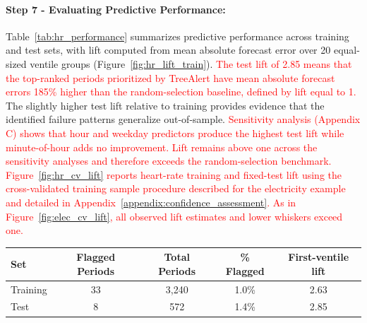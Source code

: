 \documentclass[12pt]{article}
\newcommand{\matt}[1]{\textcolor{red}{#1}}
\let\oldtable\table
\let\endoldtable\endtable
\renewenvironment{table}
  {\oldtable\spacingset{1}}
  {\endoldtable}
\begin{document}
\paragraph{Step 7 - Evaluating Predictive Performance:}
Table~\ref{tab:hr_performance} summarizes predictive performance across training and test sets, with lift computed from mean absolute forecast error over 20 equal-sized ventile groups (Figure~\ref{fig:hr_lift_train}). \matt{The test lift of 2.85 means that the top-ranked periods prioritized by TreeAlert have mean absolute forecast errors 185\% higher than the random-selection baseline, defined by lift equal to 1.} The slightly higher test lift relative to training provides evidence that the identified failure patterns generalize out-of-sample. \matt{Sensitivity analysis (Appendix C) shows that hour and weekday predictors produce the highest test lift while minute-of-hour adds no improvement. Lift remains above one across the sensitivity analyses and therefore exceeds the random-selection benchmark.}
\matt{Figure~\ref{fig:hr_cv_lift} reports heart-rate training and fixed-test lift using the cross-validated training sample procedure described for the electricity example and detailed in Appendix~\ref{appendix:confidence_assessment}. As in Figure~\ref{fig:elec_cv_lift}, all observed lift estimates and lower whiskers exceed one.}


\begin{table}
\centering
\caption{TreeAlert predictive performance -- heart rate}
\label{tab:hr_performance}
\small
\renewcommand{\arraystretch}{1.2}
\begin{tabular}{lcccc}
\toprule
\textbf{Set} & \textbf{Flagged Periods} & \textbf{Total Periods} & \textbf{\% Flagged} & \textbf{First-ventile lift} \\
\midrule
Training & 33 & 3,240 & 1.0\% & 2.63 \\
Test     & 8 & 572   & 1.4\% & 2.85 \\
\bottomrule
\end{tabular}
\end{table}
\end{document}
